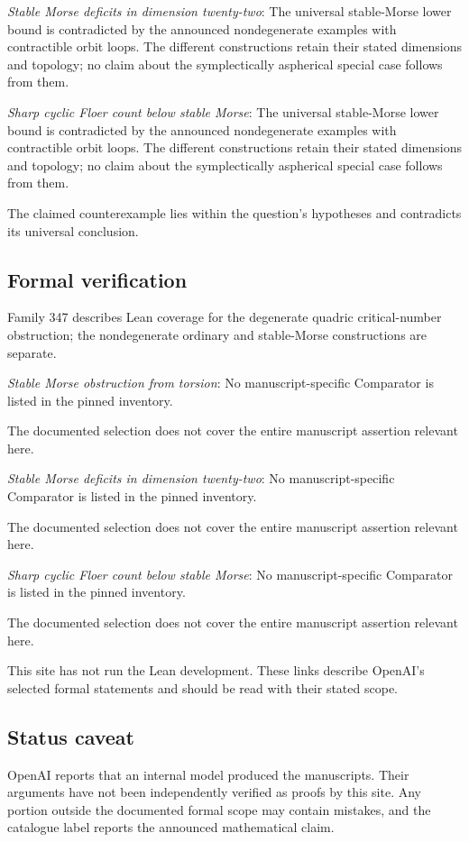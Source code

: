 \documentclass[11pt]{article}
\begin{document}
\textit{Stable Morse deficits in dimension twenty-two}: The universal stable-Morse lower bound is contradicted by the announced nondegenerate examples with contractible orbit loops. The different constructions retain their stated dimensions and topology; no claim about the symplectically aspherical special case follows from them.

\textit{Sharp cyclic Floer count below stable Morse}: The universal stable-Morse lower bound is contradicted by the announced nondegenerate examples with contractible orbit loops. The different constructions retain their stated dimensions and topology; no claim about the symplectically aspherical special case follows from them.

The claimed counterexample lies within the question’s hypotheses and contradicts its universal conclusion.

\subsection{Formal verification}
Family 347 describes Lean coverage for the degenerate quadric critical-number obstruction; the nondegenerate ordinary and stable-Morse constructions are separate.

\textit{Stable Morse obstruction from torsion}: No manuscript-specific Comparator is listed in the pinned inventory.

The documented selection does not cover the entire manuscript assertion relevant here.

\textit{Stable Morse deficits in dimension twenty-two}: No manuscript-specific Comparator is listed in the pinned inventory.

The documented selection does not cover the entire manuscript assertion relevant here.

\textit{Sharp cyclic Floer count below stable Morse}: No manuscript-specific Comparator is listed in the pinned inventory.

The documented selection does not cover the entire manuscript assertion relevant here.

This site has not run the Lean development. These links describe OpenAI’s selected formal statements and should be read with their stated scope.

\subsection{Status caveat}
OpenAI reports that an internal model produced the manuscripts. Their arguments have not been independently verified as proofs by this site. Any portion outside the documented formal scope may contain mistakes, and the catalogue label reports the announced mathematical claim.
\end{document}
